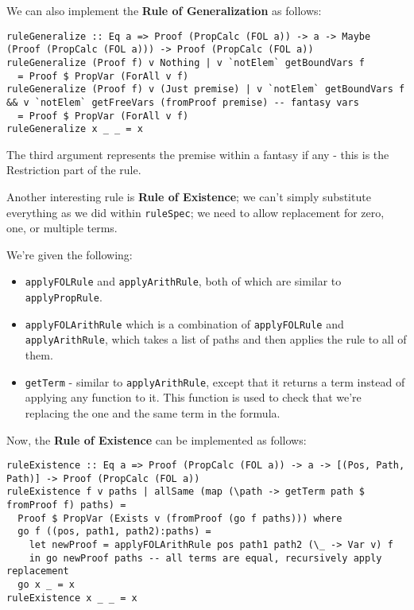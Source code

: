 \documentclass{article}
\begin{document}
We can also implement the \textbf{Rule of Generalization} as follows:

\begin{lstlisting}
ruleGeneralize :: Eq a => Proof (PropCalc (FOL a)) -> a -> Maybe (Proof (PropCalc (FOL a))) -> Proof (PropCalc (FOL a))
ruleGeneralize (Proof f) v Nothing | v `notElem` getBoundVars f
  = Proof $ PropVar (ForAll v f)
ruleGeneralize (Proof f) v (Just premise) | v `notElem` getBoundVars f && v `notElem` getFreeVars (fromProof premise) -- fantasy vars
  = Proof $ PropVar (ForAll v f)
ruleGeneralize x _ _ = x
\end{lstlisting}

The third argument represents the premise within a fantasy if any - this is the Restriction part of the rule.

Another interesting rule is \textbf{Rule of Existence}; we can't simply substitute everything as we did within \texttt{ruleSpec}; we need to allow replacement for zero, one, or multiple terms.

We're given the following:

\begin{itemize}
\item \texttt{applyFOLRule} and \texttt{applyArithRule}, both of which are similar to \texttt{applyPropRule}.
\item \texttt{applyFOLArithRule} which is a combination of \texttt{applyFOLRule} and \texttt{applyArithRule}, which takes a list of paths and then applies the rule to all of them.
\item \texttt{getTerm} - similar to \texttt{applyArithRule}, except that it returns a term instead of applying any function to it. This function is used to check that we're replacing the one and the same term in the formula.
\end{itemize}

Now, the \textbf{Rule of Existence} can be implemented as follows:

\begin{lstlisting}
ruleExistence :: Eq a => Proof (PropCalc (FOL a)) -> a -> [(Pos, Path, Path)] -> Proof (PropCalc (FOL a))
ruleExistence f v paths | allSame (map (\path -> getTerm path $ fromProof f) paths) =
  Proof $ PropVar (Exists v (fromProof (go f paths))) where
  go f ((pos, path1, path2):paths) =
    let newProof = applyFOLArithRule pos path1 path2 (\_ -> Var v) f
    in go newProof paths -- all terms are equal, recursively apply replacement
  go x _ = x
ruleExistence x _ _ = x
\end{lstlisting}
\end{document}
